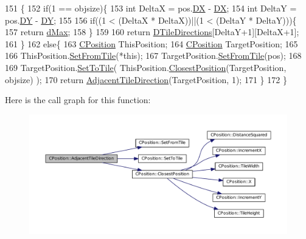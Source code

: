 \begin{DoxyCode}
151                                                                                   \{
152     \textcolor{keywordflow}{if}(1 == objsize)\{
153         \textcolor{keywordtype}{int} DeltaX = pos.\hyperlink{classCPosition_a28445f9b872169715919074d82044eda}{DX} - \hyperlink{classCPosition_a28445f9b872169715919074d82044eda}{DX};
154         \textcolor{keywordtype}{int} DeltaY = pos.\hyperlink{classCPosition_a84139c9e8eb547e7cf3cb851739943a4}{DY} - \hyperlink{classCPosition_a84139c9e8eb547e7cf3cb851739943a4}{DY};
155         
156         \textcolor{keywordflow}{if}((1 < (DeltaX * DeltaX))||(1 < (DeltaY * DeltaY)))\{
157             \textcolor{keywordflow}{return} \hyperlink{GameDataTypes_8h_acb2b033915f6659a71a38b5aa6e4eb42af6546049275557ce0ade2ceee042a319}{dMax};   
158         \}
159         
160         \textcolor{keywordflow}{return} \hyperlink{classCPosition_ab4bc566d2d14d378cfdf6b1d2d3f522e}{DTileDirections}[DeltaY+1][DeltaX+1];
161     \}
162     \textcolor{keywordflow}{else}\{
163          \hyperlink{classCPosition}{CPosition} ThisPosition;
164          \hyperlink{classCPosition}{CPosition} TargetPosition;
165          
166          ThisPosition.\hyperlink{classCPosition_a46994e6a8b8e3b4237edd7259ad844b6}{SetFromTile}(*\textcolor{keyword}{this});
167          TargetPosition.\hyperlink{classCPosition_a46994e6a8b8e3b4237edd7259ad844b6}{SetFromTile}(pos);
168          
169          TargetPosition.\hyperlink{classCPosition_ae302aa21792de64c97de29e2cbbfeb94}{SetToTile}( ThisPosition.\hyperlink{classCPosition_a91fd43eeb2c894bcb7577ae87247b726}{ClosestPosition}(TargetPosition, 
      objsize) );
170          \textcolor{keywordflow}{return} \hyperlink{classCPosition_a2295901e4c35cfc81304f9a217e34ac7}{AdjacentTileDirection}(TargetPosition, 1);
171     \}
172 \}
\end{DoxyCode}
Here is the call graph for this function\+:
\nopagebreak
\begin{figure}[H]
\begin{center}
\leavevmode
\includegraphics[width=350pt]{classCPosition_a2295901e4c35cfc81304f9a217e34ac7_cgraph}
\end{center}
\end{figure}
